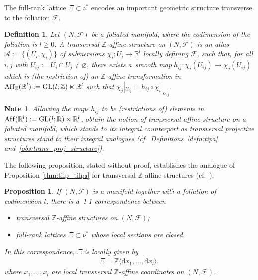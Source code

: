 \documentclass[pdftex]{sigma}
\numberwithin{equation}{section}
\newtheorem{Proposition}[Theorem]{Proposition}
\newtheorem{Definition}[Theorem]{Definition}
\newtheorem{Note}[Theorem]{Note}
\newcommand{\de}{\mathrm{d}} %
\newcommand{\RR}{\mathbb{R}}
\newcommand{\ZZ}{\mathbb{Z}}
\begin{document}
The full-rank lattice $\Xi \subset \nu^*$ encodes an important geometric structure transverse to the foliation $\mathcal{F}$.

\begin{Definition}\label{defn:tias}
Let $(N,\mathcal{F})$ be a foliated manifold, where the codimension of the foliation is $l \geq 0$. A {\it transversal $\ZZ$-affine structure} on $(N,\mathcal{F})$ is an atlas $\mathcal{A} :=\{(U_i, \chi_i)\}$ of submersions $\chi_i \colon U_i \to \RR^l$ locally def\/ining $\mathcal{F}$, such that, for all $i,j$ with $U_{ij} := U_i \cap U_j \neq \varnothing$, there exists a~smooth map $h_{ij}\colon \chi_i(U_{ij}) \to \chi_j(U_{ij})$ which is (the restriction of) an $\ZZ$-af\/f\/ine transformation in $\operatorname{Af\/f}_{\ZZ}(\RR^l) := \mathrm{GL}(l;\ZZ) \ltimes \RR^l$ such that $\chi_j|_{U_{ij}} = h_{ij} \circ \chi_i|_{U_{ij}}$.
\end{Definition}

\begin{Note}\label{obs:trans_aff_structure}
Allowing the maps $h_{ij}$ to be (restrictions of) elements in $\operatorname{Af\/f}(\RR^l) := \mathrm{GL}(l;\RR) \ltimes \RR^l$, obtain the notion of {\it transversal affine structure} on a foliated manifold, which stands to its integral counterpart as transversal projective structures stand to their integral analogues (cf.\ Def\/initions~\ref{defn:tipa} and~\ref{obs:trans_proj_structure}).
\end{Note}

The following proposition, stated without proof, establishes the analogue of Proposition \ref{thm:tilp_tilpa} for transversal $\ZZ$-af\/f\/ine structures (cf.\ \cite[Proposition~3.2.4]{PMCT2}).

\begin{Proposition}\label{prop:correspondence}
If $(N,\mathcal{F})$ is a manifold together with a foliation of codimension $l$, there is a~{\rm 1-1} correspondence between
 \begin{itemize}\itemsep=0pt
 \item transversal $\ZZ$-affine structures on $(N,\mathcal{F})$;
 \item full-rank lattices $\Xi \subset \nu^*$ whose local sections are closed.
 \end{itemize}
In this correspondence, $\Xi$ is locally given by
 \begin{gather*}
 \Xi = \ZZ \langle \de x_1,\ldots , \de x_l \rangle,
 \end{gather*}
where $x_1,\ldots,x_l$ are local transversal $\ZZ$-affine coordinates on $(N,\mathcal{F})$.
\end{Proposition}
\end{document}
